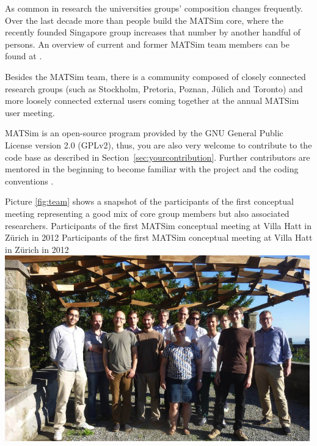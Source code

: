 As common in research the universities groups' composition changes frequently. Over the last decade more than  people build the MATSim core, where the recently founded Singapore group increases that number by another handful of persons. An overview of current and former MATSim team members can be found at .

Besides the MATSim team, there is a community composed of closely connected research groups (such as Stockholm, Pretoria, Poznan, Jülich and Toronto) and more loosely connected external users coming together at the annual MATSim user meeting.   

MATSim is an open-source program provided by the GNU General Public License version 2.0 (GPLv2), thus, you are also very welcome to contribute to the code base as described in Section~\ref{sec:yourcontribution}. Further contributors are mentored in the beginning \citep[][]{MATSIM-T-BecomingAContributor_Webpage_2014} to become familiar with the project and the coding conventions \citep[][]{MATSIM-T-CodingGuide_Webpage_2014}.

Picture \ref{fig:team} shows a snapshot of the participants of the first conceptual meeting representing a good mix of core group members but also associated researchers.
%
\createfigure%
{Participants of the first MATSim conceptual meeting at Villa Hatt in Zürich in 2012}%
{Participants of the first MATSim conceptual meeting at Villa Hatt in Zürich in 2012}%
{\label{fig:team}}%
{\includegraphics[width=0.99\textwidth, angle=0]{extending/figures/ConceptualMeetingVillaHatt.png}}%
{}

